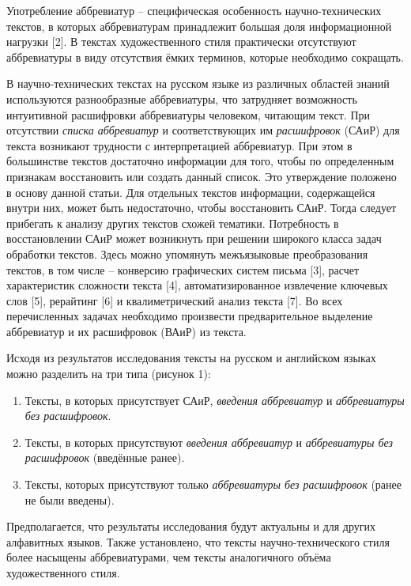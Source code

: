 \documentclass[fleqn, a4paper,12pt]{article}
\begin{document}
Употребление аббревиатур – специфическая особенность научно-технических текстов, в которых аббревиатурам принадлежит большая доля информационной нагрузки [2]. В текстах художественного стиля практически отсутствуют аббревиатуры в виду отсутствия ёмких терминов, которые необходимо сокращать.

В научно-технических текстах на русском языке из различных областей знаний используются разнообразные аббревиатуры, что затрудняет возможность интуитивной расшифровки аббревиатуры человеком, читающим текст. При отсутствии \textit{списка аббревиатур} и соответствующих им \textit{расшифровок} (САиР) для текста возникают трудности с интерпретацией аббревиатур. При этом в большинстве текстов достаточно информации для того, чтобы по определенным признакам восстановить или создать данный список. Это утверждение положено в основу данной статьи. Для отдельных текстов информации, содержащейся внутри них, может быть недостаточно, чтобы восстановить САиР. Тогда следует прибегать к анализу других текстов схожей тематики.
Потребность в восстановлении САиР может возникнуть при решении широкого класса задач обработки текстов. Здесь можно упомянуть межъязыковые преобразования текстов, в том числе – конверсию графических систем письма [3], расчет характеристик сложности текста [4], автоматизированное извлечение ключевых слов [5], рерайтинг [6] и квалиметрический анализ текста [7]. Во всех перечисленных задачах необходимо произвести предварительное выделение аббревиатур и их расшифровок (ВАиР) из текста.

Исходя из результатов исследования тексты на русском и английском языках можно разделить на три типа (рисунок 1):
\begin{enumerate}[label=\arabic*., nosep]
\item Тексты, в которых присутствует САиР, \textit{введения аббревиатур} и \textit{аббревиатуры без расшифровок}.
\item Тексты, в которых присутствуют \textit{введения аббревиатур} и \textit{аббревиатуры без расшифровок} (введённые ранее).
\item Тексты, которых присутствуют только \textit{аббревиатуры без расшифровок} (ранее не были введены).
\end{enumerate}

Предполагается, что результаты исследования будут актуальны и для других алфавитных языков. Также установлено, что тексты научно-технического стиля более насыщены аббревиатурами, чем тексты аналогичного объёма художественного стиля.
\end{document}
